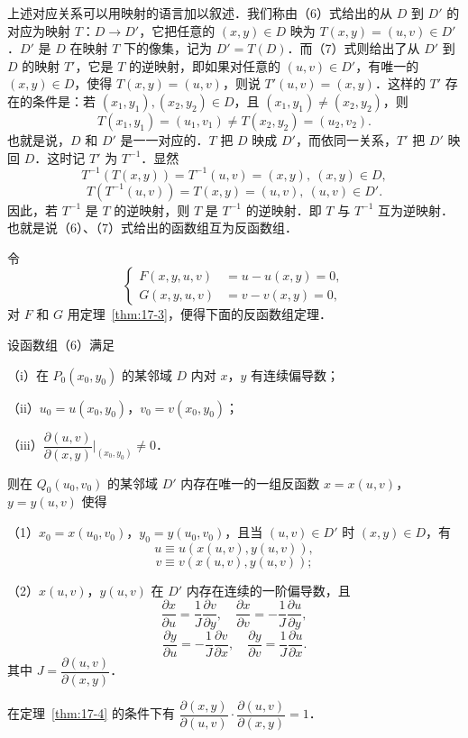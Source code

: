 上述对应关系可以用映射的语言加以叙述．我们称由（6）式给出的从 $D$ 到 $D'$ 的对应为映射 $T$：$D\to D'$，它把任意的 $(x,y)\in D$ 映为 $T(x,y)=(u,v)\in D'$．$D'$ 是 $D$ 在映射 $T$ 下的像集，记为 $D'=T(D)$．而（7）式则给出了从 $D'$ 到 $D$ 的映射 $T'$，它是 $T$ 的逆映射，即如果对任意的 $(u,v)\in D'$，有唯一的 $(x,y)\in D$，使得 $T(x,y)=(u,v)$，则说 $T'(u,v)=(x,y)$．这样的 $T'$ 存在的条件是：若 $(x_{1},y_{1}),(x_{2},y_{2})\in D$，且 $(x_{1},y_{1})\neq(x_{2},y_{2})$，则
\[
T(x_{1},y_{1})=(u_{1},v_{1})\neq T(x_{2},y_{2})=(u_{2},v_{2}).
\]
也就是说，$D$ 和 $D'$ 是一一对应的．$T$ 把 $D$ 映成 $D'$，而依同一关系，$T'$ 把 $D'$ 映回 $D$．这时记 $T'$ 为 $T^{-1}$．显然
\[
T^{-1}(T(x,y))=T^{-1}(u,v)=(x,y),\ (x,y)\in D,
\]
\[
T(T^{-1}(u,v))=T(x,y)=(u,v),\ (u,v)\in D'.
\]
因此，若 $T^{-1}$ 是 $T$ 的逆映射，则 $T$ 是 $T^{-1}$ 的逆映射．即 $T$ 与 $T^{-1}$ 互为逆映射．也就是说（6）、（7）式给出的函数组互为反函数组．

令
\[
\left\{\begin{aligned}
F(x,y,u,v)&=u-u(x,y)=0,\\
G(x,y,u,v)&=v-v(x,y)=0,
\end{aligned}\right.
\]
对 $F$ 和 $G$ 用定理~\ref{thm:17-3}，便得下面的反函数组定理．

\begin{theorem}\label{thm:17-4}
设函数组（6）满足

（i）在 $P_{0}(x_{0},y_{0})$ 的某邻域 $D$ 内对 $x$，$y$ 有连续偏导数；

（ii）$u_{0}=u(x_{0},y_{0})$，$v_{0}=v(x_{0},y_{0})$；

（iii）$\dfrac{\partial(u,v)}{\partial(x,y)}\bigg|_{(x_{0},y_{0})}\neq0$．

则在 $Q_{0}(u_{0},v_{0})$ 的某邻域 $D'$ 内存在唯一的一组反函数 $x=x(u,v)$，$y=y(u,v)$ 使得

（1）$x_{0}=x(u_{0},v_{0})$，$y_{0}=y(u_{0},v_{0})$，且当 $(u,v)\in D'$ 时 $(x,y)\in D$，有
\[
u\equiv u(x(u,v),y(u,v)),
\]
\[
v\equiv v(x(u,v),y(u,v));
\]

（2）$x(u,v)$，$y(u,v)$ 在 $D'$ 内存在连续的一阶偏导数，且
\[
\frac{\partial x}{\partial u}=\frac{1}{J}\frac{\partial v}{\partial y},\quad \frac{\partial x}{\partial v}=-\frac{1}{J}\frac{\partial u}{\partial y},
\]
\[
\frac{\partial y}{\partial u}=-\frac{1}{J}\frac{\partial v}{\partial x},\quad \frac{\partial y}{\partial v}=\frac{1}{J}\frac{\partial u}{\partial x}.
\]
其中 $J=\dfrac{\partial(u,v)}{\partial(x,y)}$．
\end{theorem}

\begin{corollary}\label{cor:17-1}
在定理~\ref{thm:17-4} 的条件下有 $\dfrac{\partial(x,y)}{\partial(u,v)}\cdot\dfrac{\partial(u,v)}{\partial(x,y)}=1$．
\end{corollary}


